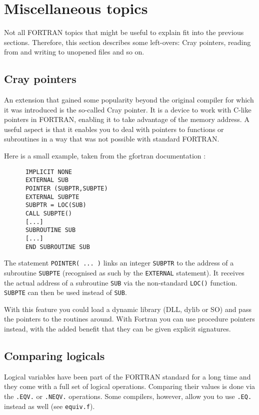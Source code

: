 \section{Miscellaneous topics}
Not all FORTRAN topics that might be useful to explain fit into the previous sections.
Therefore, this section describes some left-overs: Cray pointers, reading from and writing to
unopened files and so on.

\subsection{Cray pointers}
An extension that gained some popularity beyond the original compiler for which it was introduced
is the so-called Cray pointer. It is a device to work with C-like pointers in FORTRAN, enabling
it to take advantage of the memory address. A useful aspect is that it enables you to deal
with pointers to functions or subroutines in a way that was not possible with standard FORTRAN.

Here is a small example, taken from the gfortran documentation \cite{F77Cray}:
\begin{verbatim}
      IMPLICIT NONE
      EXTERNAL SUB
      POINTER (SUBPTR,SUBPTE)
      EXTERNAL SUBPTE
      SUBPTR = LOC(SUB)
      CALL SUBPTE()
      [...]
      SUBROUTINE SUB
      [...]
      END SUBROUTINE SUB
\end{verbatim}

The statement \verb+POINTER( ... )+ links an integer \verb+SUBPTR+ to the address of a subroutine
\verb+SUBPTE+ (recognised as such by the \verb+EXTERNAL+ statement). It receives the actual
address of a subroutine \verb+SUB+ via the non-standard \verb+LOC()+ function. \verb+SUBPTE+ can then
be used instead of \verb+SUB+.

With this feature you could load a dynamic library (DLL, dylib or SO) and pass the pointers to the
routines around. With Fortran you can use procedure pointers instead, with the added benefit that
they can be given explicit signatures.

\subsection{Comparing logicals}
Logical variables have been part of the FORTRAN standard for a long time and they come with a full
set of logical operations. Comparing their values is done via the \verb+.EQV.+ or \verb+.NEQV.+ operations.
Some compilers, however, allow you to use \verb+.EQ.+ instead as well (see \verb+equiv.f+).

